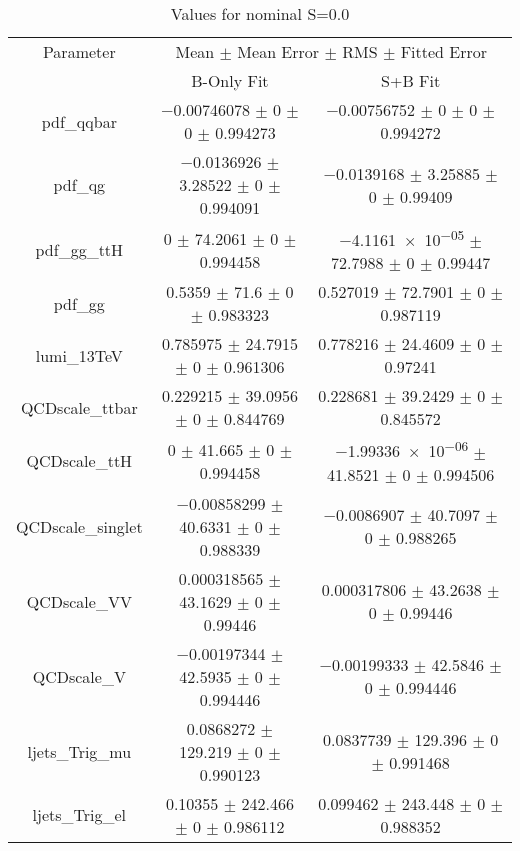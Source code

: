 \begin{table}
\centering
\caption{Values for nominal S=0.0}
\begin{tabular}{ccc}
\toprule
Parameter & \multicolumn{2}{c}{Mean $\pm$ Mean Error $\pm$ RMS $\pm$ Fitted Error}\\
 & B-Only Fit & S+B Fit\\
\midrule
pdf\_qqbar & \num{-0.00746078} $\pm$ \num{0} $\pm$ \num{0} $\pm$ \num{0.994273} & \num{-0.00756752} $\pm$ \num{0} $\pm$ \num{0} $\pm$ \num{0.994272}\\
pdf\_qg & \num{-0.0136926} $\pm$ \num{3.28522} $\pm$ \num{0} $\pm$ \num{0.994091} & \num{-0.0139168} $\pm$ \num{3.25885} $\pm$ \num{0} $\pm$ \num{0.99409}\\
pdf\_gg\_ttH & \num{0} $\pm$ \num{74.2061} $\pm$ \num{0} $\pm$ \num{0.994458} & \num{-4.1161e-05} $\pm$ \num{72.7988} $\pm$ \num{0} $\pm$ \num{0.99447}\\
pdf\_gg & \num{0.5359} $\pm$ \num{71.6} $\pm$ \num{0} $\pm$ \num{0.983323} & \num{0.527019} $\pm$ \num{72.7901} $\pm$ \num{0} $\pm$ \num{0.987119}\\
lumi\_13TeV & \num{0.785975} $\pm$ \num{24.7915} $\pm$ \num{0} $\pm$ \num{0.961306} & \num{0.778216} $\pm$ \num{24.4609} $\pm$ \num{0} $\pm$ \num{0.97241}\\
QCDscale\_ttbar & \num{0.229215} $\pm$ \num{39.0956} $\pm$ \num{0} $\pm$ \num{0.844769} & \num{0.228681} $\pm$ \num{39.2429} $\pm$ \num{0} $\pm$ \num{0.845572}\\
QCDscale\_ttH & \num{0} $\pm$ \num{41.665} $\pm$ \num{0} $\pm$ \num{0.994458} & \num{-1.99336e-06} $\pm$ \num{41.8521} $\pm$ \num{0} $\pm$ \num{0.994506}\\
QCDscale\_singlet & \num{-0.00858299} $\pm$ \num{40.6331} $\pm$ \num{0} $\pm$ \num{0.988339} & \num{-0.0086907} $\pm$ \num{40.7097} $\pm$ \num{0} $\pm$ \num{0.988265}\\
QCDscale\_VV & \num{0.000318565} $\pm$ \num{43.1629} $\pm$ \num{0} $\pm$ \num{0.99446} & \num{0.000317806} $\pm$ \num{43.2638} $\pm$ \num{0} $\pm$ \num{0.99446}\\
QCDscale\_V & \num{-0.00197344} $\pm$ \num{42.5935} $\pm$ \num{0} $\pm$ \num{0.994446} & \num{-0.00199333} $\pm$ \num{42.5846} $\pm$ \num{0} $\pm$ \num{0.994446}\\
ljets\_Trig\_mu & \num{0.0868272} $\pm$ \num{129.219} $\pm$ \num{0} $\pm$ \num{0.990123} & \num{0.0837739} $\pm$ \num{129.396} $\pm$ \num{0} $\pm$ \num{0.991468}\\
ljets\_Trig\_el & \num{0.10355} $\pm$ \num{242.466} $\pm$ \num{0} $\pm$ \num{0.986112} & \num{0.099462} $\pm$ \num{243.448} $\pm$ \num{0} $\pm$ \num{0.988352}\\

\end{tabular}
\end{table}
